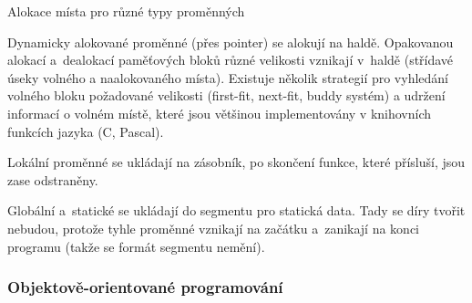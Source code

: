 \begin{obecne}{Alokace místa pro různé typy proměnných}
\begin{pitemize}
    \item Dynamicky alokované proměnné (přes pointer) se alokují na haldě. Opakovanou alokací a~dealokací paměťových bloků různé velikosti vznikají v~haldě  (střídavé úseky volného a naalokovaného místa). Existuje několik strategií pro vyhledání volného bloku požadované velikosti (first-fit, next-fit, buddy systém) a udržení informací o volném místě, které jsou většinou implementovány v knihovních funkcích jazyka (C, Pascal).
    \item Lokální proměnné se ukládají na zásobník, po skončení funkce, které přísluší, jsou zase odstraněny.
    \item Globální a~statické se ukládají do segmentu pro statická data. Tady se díry tvořit nebudou, protože tyhle proměnné vznikají na začátku a~zanikají na konci programu (takže se formát segmentu nemění).
\end{pitemize}
\end{obecne}



\subsubsection*{Objektově-orientované programování}

